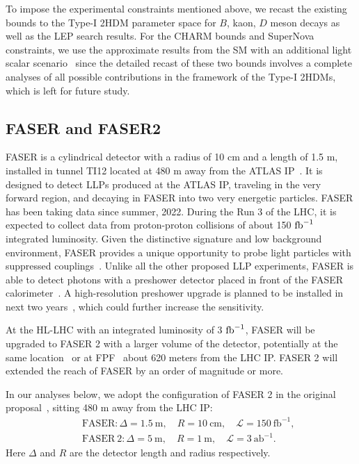 \documentclass[letterpaper,11pt]{article}
\begin{document}
To impose the experimental constraints mentioned above, we recast the existing bounds to the Type-I 2HDM parameter space for $B$, kaon, $D$ meson decays as well as the LEP search results. For the CHARM bounds and SuperNova constraints, we use the approximate results from the SM with an additional light scalar scenario~\cite{Winkler:2018qyg,Dobrich:2018jyi} since the detailed recast of these two bounds involves a complete analyses of all possible contributions in the framework of the Type-I 2HDMs, which is left for future study.


\subsection{FASER and FASER2}
FASER is a cylindrical detector with a radius of 10 cm and a length of 1.5 m, installed in tunnel TI12 located at 480 m away from the ATLAS IP~\cite{Feng:2017uoz, FASER:2018ceo, FASER:2018bac, FASER:2022hcn, FASER:2021ljd,FASER:2021cpr}.  It is designed to detect LLPs produced at the ATLAS IP,   traveling in the very forward region,  and decaying in FASER into two very energetic particles.  FASER has been taking data since summer, 2022.   During the Run 3 of the LHC,  it is expected to collect data from proton-proton collisions of about 150 ${\rm fb}^{-1}$ integrated luminosity.  Given the distinctive signature and low background environment,  FASER provides a unique opportunity to probe light particles with suppressed couplings~\cite{Feng:2017uoz, FASER:2018eoc, FASER:2018bac}. Unlike all the other proposed LLP experiments,  FASER is able to detect photons with a preshower detector placed in front of the FASER calorimeter~\cite{Feng:2018pew, Kling:2020mch}.  A high-resolution preshower upgrade is planned to be installed in next two years~\cite{Boyd:2803084}, which could further increase the sensitivity.  

At the HL-LHC with an integrated luminosity of 3 ${\rm fb}^{-1}$,   FASER will be upgraded to FASER 2 with a larger volume of the detector, potentially at the same location~\cite{FASER:2018eoc} or at FPF~\cite{Anchordoqui:2021ghd, Feng:2022inv} about 620 meters from the LHC IP.  FASER 2 will extended the reach of FASER by an order of magnitude or more.   

In our analyses below, we adopt the configuration of FASER 2 in the original proposal~\cite{FASER:2018eoc}, sitting  480 m away from the LHC IP: 
\begin{eqnarray}
&&\mathrm{FASER}: \Delta=1.5 \mathrm{~m}, \quad R=10 \mathrm{~cm}, \quad \mathcal{L}=150 ~\mathrm{fb}^{-1}, 
\label{eq:FASER}
\\
&&\mathrm{FASER ~2}: \Delta=5 \mathrm{~m}, \quad R=1 \mathrm{~m}, \quad \mathcal{L}=3 ~\mathrm{ab}^{-1}.
\label{eq:FASER2}
\end{eqnarray}
Here $\Delta$ and $R$ are the detector length and radius respectively. 
 
\end{document}
